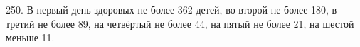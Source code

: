 250. В первый день здоровых не более 362 детей, во второй не более 180, в третий не более 89, на четвёртый не более 44, на пятый не более 21, на шестой меньше 11.\\

